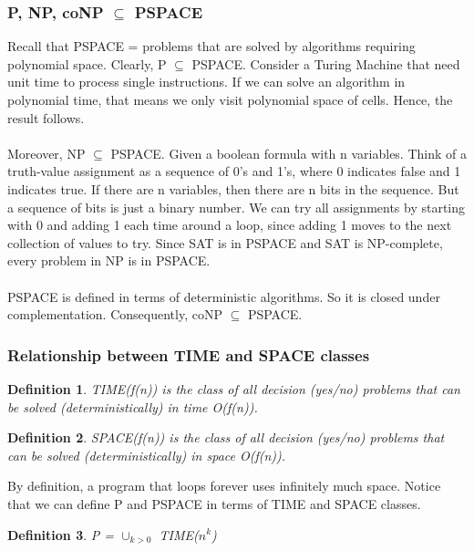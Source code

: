 \documentclass[12pt]{article}
\newtheorem{definition}{Definition}
\begin{document}
\subsubsection{P, NP, coNP $\subseteq$ PSPACE}
Recall that PSPACE = problems that are solved by algorithms requiring polynomial space. Clearly, P $\subseteq$ PSPACE. Consider a Turing Machine that need unit time to process single instructions. If we can solve an algorithm in polynomial time, that means we only visit polynomial space of cells. Hence, the result follows.
\\
\\
Moreover, NP $\subseteq$ PSPACE. Given a boolean formula with n variables. Think of a truth-value assignment as a sequence of 0's and 1's, where 0 indicates false and 1 indicates true. If there are n variables, then there are n bits in the sequence. But a sequence of bits is just a binary number. We can try all assignments by starting with 0 and adding 1 each time around a loop, since adding 1 moves to the next collection of values to try. Since SAT is in PSPACE and SAT is NP-complete, every problem in NP is in PSPACE.
\\
\\
PSPACE is defined in terms of deterministic algorithms. So it is closed under complementation. Consequently, coNP $\subseteq$ PSPACE.

\subsubsection{Relationship between TIME and SPACE classes}

\begin{definition}
    TIME(f(n)) is the class of all decision (yes/no) problems that can be solved (deterministically) in time O(f(n)).
\end{definition}

\begin{definition}
    SPACE(f(n)) is the class of all decision (yes/no) problems that can be solved (deterministically) in space O(f(n)).
\end{definition}

\noindent By definition, a program that loops forever uses infinitely much space. Notice that we can define P and PSPACE in terms of TIME and SPACE classes.

\begin{definition}
    P = $\cup _{k>0}$ TIME($n^k$)
\end{definition}
\end{document}

